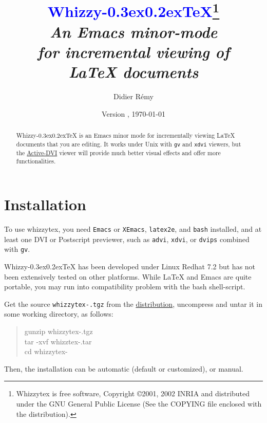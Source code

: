 \documentclass[12pt]{article}
\makeatletter
\def \whizzy {{Whizzy\kern -0.3ex\raise 0.2ex\hbox{\let \@\relax\TeX}}}
\def \Whizzy{\textbf {\textcolor {blue}{\whizzy}}}
\makeatother
\begin{document}
\pagestyle {empty}
\author {Didier R{\'e}my}
\date {Version {\version}, \today}
\title {
{\huge \Whizzy\footnote{Whizzytex is free software, 
Copyright \copyright 2001, 2002 INRIA
and distributed under the GNU General Public License
(See the COPYING file enclosed with the distribution).}}
\\[1em]
{\em An {\bfseries Emacs} minor-mode \\
for {\bfseries incremental viewing of} \\ 
{\bfseries {\LaTeX} documents}}
}

\maketitle   


\begin{abstract}
\def \B{\textbf}
{\whizzy}
is an Emacs minor mode for incrementally
viewing {\LaTeX} documents that you are editing.
%
It works under Unix with {\tt gv} and {\tt xdvi} viewers, but 
the \href{http://pauillac.inria.fr/advi/}{Active-DVI} viewer will
provide much better visual effects and offer more functionalities.
\end{abstract}

\section {Installation}

To use whizzytex, you need {\tt Emacs} or {\tt XEmacs}, {\tt latex2e}, and
{\tt bash} installed, and at least one DVI or Postscript previewer, such as
{\tt advi}, {\tt xdvi}, or {\tt dvips} combined with {\tt gv}. 

{\whizzy} has been developed under Linux Redhat 7.2 but has not been
extensively tested on other platforms. While {\LaTeX} and Emacs are quite
portable, you may run into compatibility problem with the bash
shell-script. 

Get the source {\tt whizzytex-\version.tgz} 
from the \href{http://pauillac.inria.fr/whizzytex}{distribution}, 
uncompress and untar it in some working directory, as follows:
\begin{quote}
\begin{tt}
gunzip whizzytex-\version.tgz\\
tar -xvf whizztex-\version.tar\\
cd whizzytex-\version
\end{tt}
\end{quote}
Then, the installation can be automatic (default or customized), or manual.
\end{document}
